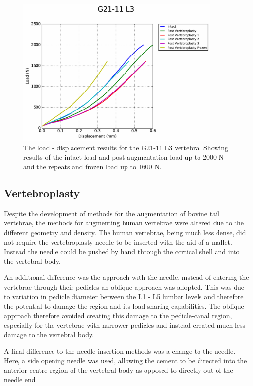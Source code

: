 \begin{figure}[ht]
\centering
\includegraphics[width=4in]{Chapters/Chapter_HT_images/G21-11_L3.pdf}
\caption{The load - displacement results for the G21-11 L3 vertebra. Showing results of the intact load and post augmentation load up to 2000 N and the repeats and frozen load up to 1600 N.}
\label{fig:G21-11_L3}
\end{figure}






\subsection{Vertebroplasty}

Despite the development of methods for the augmentation of bovine tail vertebrae, the methods for augmenting human vertebrae were altered due to the different geometry and density.
The human vertebrae, being much less dense, did not require the vertebroplasty needle to be inserted with the aid of a mallet.
Instead the needle could be pushed by hand through the cortical shell and into the vertebral body.

An additional difference was the approach with the needle, instead of entering
the vertebrae through their pedicles an oblique approach was adopted.
This was due to variation in pedicle diameter between the L1 - L5 lumbar levels and therefore the potential to damage the region and its load sharing capabilities.
The oblique approach therefore avoided creating this damage to the pedicle-canal region, especially for the vertebrae with narrower pedicles and instead created much less damage to the vertebral body.

A final difference to the needle insertion methods was a change to the needle.
Here, a side opening needle was used, allowing the cement to be directed into the anterior-centre region of the vertebral body as opposed to directly out of the needle end.

